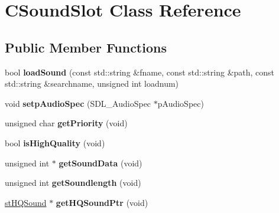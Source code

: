 \hypertarget{class_c_sound_slot}{
\section{CSoundSlot Class Reference}
\label{class_c_sound_slot}
}
\subsection*{Public Member Functions}
\begin{DoxyCompactItemize}
\item 
\hypertarget{class_c_sound_slot_a00a1fbe6252e726efaaf6d22adf0eecf}{
bool {\bfseries loadSound} (const std::string \&fname, const std::string \&path, const std::string \&searchname, unsigned int loadnum)}
\label{class_c_sound_slot_a00a1fbe6252e726efaaf6d22adf0eecf}

\item 
\hypertarget{class_c_sound_slot_ad9756765a15e5a98d1c327d64591da2e}{
void {\bfseries setpAudioSpec} (SDL\_\-AudioSpec $\ast$pAudioSpec)}
\label{class_c_sound_slot_ad9756765a15e5a98d1c327d64591da2e}

\item 
\hypertarget{class_c_sound_slot_a4301360924d84cb9d594e6663ae4e155}{
unsigned char {\bfseries getPriority} (void)}
\label{class_c_sound_slot_a4301360924d84cb9d594e6663ae4e155}

\item 
\hypertarget{class_c_sound_slot_a781a4e196e3a7869d3a1cc39c83b8b9c}{
bool {\bfseries isHighQuality} (void)}
\label{class_c_sound_slot_a781a4e196e3a7869d3a1cc39c83b8b9c}

\item 
\hypertarget{class_c_sound_slot_a7ecca5a856a1cb330cf702dee68da063}{
unsigned int $\ast$ {\bfseries getSoundData} (void)}
\label{class_c_sound_slot_a7ecca5a856a1cb330cf702dee68da063}

\item 
\hypertarget{class_c_sound_slot_a8adc3c96f2654c27d36e352ace3ce5d7}{
unsigned int {\bfseries getSoundlength} (void)}
\label{class_c_sound_slot_a8adc3c96f2654c27d36e352ace3ce5d7}

\item 
\hypertarget{class_c_sound_slot_a450b5e964a850987856293a0162a2a2c}{
\hyperlink{structst_h_q_sound}{stHQSound} $\ast$ {\bfseries getHQSoundPtr} (void)}
\label{class_c_sound_slot_a450b5e964a850987856293a0162a2a2c}

\end{DoxyCompactItemize}
